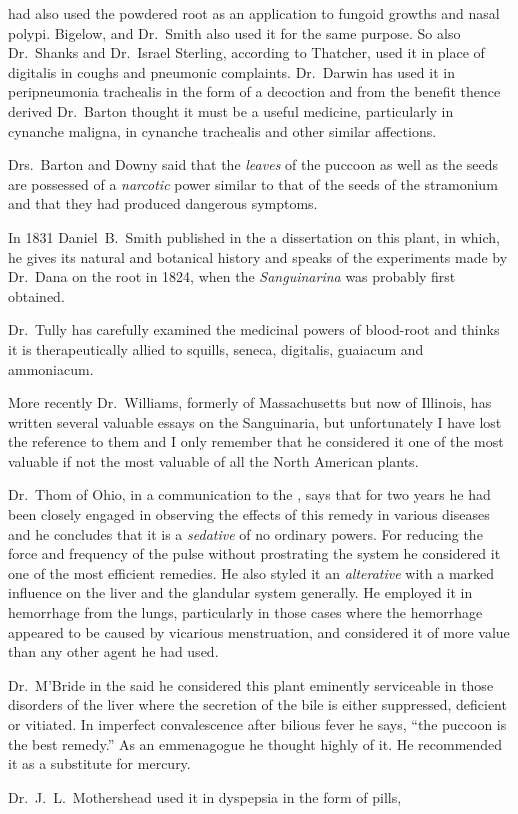 had also used the powdered root as an application to fungoid growths
and nasal polypi. Bigelow, and Dr.\ Smith also used it for the same
purpose. So also Dr.\ Shanks and Dr.\ Israel Sterling, according to
Thatcher, used it in place of digitalis in coughs and pneumonic complaints.
Dr.\ Darwin has used it in peripneumonia trachealis in the
form of a decoction and from the benefit thence derived Dr.\ Barton
thought it must be a useful medicine, particularly in cynanche maligna,
in cynanche trachealis and other similar affections.

Drs.~Barton and Downy said that the \emph{leaves} of the puccoon as well as
the seeds are possessed of a \emph{narcotic} power similar to that of the seeds
of the stramonium and that they had produced dangerous symptoms.

In 1831 Daniel~B.~Smith published in the  a dissertation on this plant, in which,
he gives its natural and botanical history and speaks of the experiments
made by Dr.\ Dana on the root in 1824, when the \emph{Sanguinarina} was
probably first obtained.

Dr.\ Tully has carefully examined the medicinal powers of blood-root
and thinks it is therapeutically allied to squills, seneca, digitalis, guaiacum
and ammoniacum.

More recently Dr.\ Williams, formerly of Massachusetts but now of
Illinois, has written several valuable essays on the Sanguinaria, but
unfortunately I have lost the reference to them and I only remember
that he considered it one of the most valuable if not the most valuable
of all the North American plants.

Dr.\ Thom of Ohio, in a communication to the ,
says that for two years he had been closely engaged in observing the
effects of this remedy in various diseases and he concludes that it is a
\emph{sedative} of no ordinary powers. For reducing the force and frequency
of the pulse without prostrating the system he considered it one of the
most efficient remedies. He also styled it an \emph{alterative} with a marked
influence on the liver and the glandular system generally. He employed
it in hemorrhage from the lungs, particularly in those cases where
the hemorrhage appeared to be caused by vicarious menstruation, and
considered it of more value than any other agent he had used.

Dr.\ M'Bride in the  said he considered this
plant eminently serviceable in those disorders of the liver where the
secretion of the bile is either suppressed, deficient or vitiated. In imperfect
convalescence after bilious fever he says, ``the puccoon is the
best remedy.'' As an emmenagogue he thought highly of it. He
recommended it as a substitute for mercury.

Dr.\ J.~L.\ Mothershead used it in dyspepsia in the form of pills,\endinput
